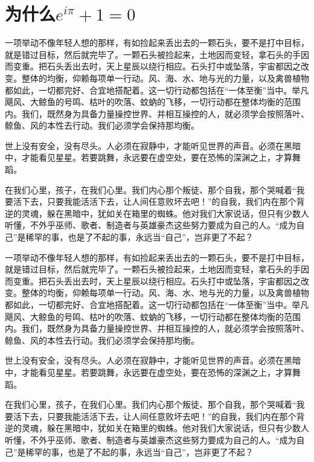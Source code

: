 \section{为什么$e^{i\pi} + 1 = 0$}
一项举动不像年轻人想的那样，有如捡起来丢出去的一颗石头，要不是打中目标，就是错过目标，然后就完毕了。一颗石头被捡起来，土地因而变轻，拿石头的手因而变重。把石头丢出去时，天上星辰以绕行相应。石头打中或坠落，宇宙都因之改变。整体的均衡，仰赖每项单一行动。风、海、水、地与光的力量，以及禽兽植物都如此，一切都完好、合宜地搭配着。这一切行动都包括在“一体至衡”当中。举凡飓风、大鲸鱼的号鸣、枯叶的吹落、蚊蚋的飞移，一切行动都在整体均衡的范围内。我们，既然身为具备力量操控世界、并相互操控的人，就必须学会按照落叶、鲸鱼、风的本性去行动。我们必须学会保持那均衡。


世上没有安全，没有尽头。人必须在寂静中，才能听见世界的声音。必须在黑暗中，才能看见星星。若要跳舞，永远要在虚空处，要在恐怖的深渊之上，才算舞蹈。


在我们心里，孩子，在我们心里。我们内心那个叛徒、那个自我，那个哭喊着“我要活下去，只要我能活活下去，让人间任意败坏去吧！”的自我，我们内在那个背逆的灵魂，躲在黑暗中，犹如关在箱里的蜘蛛。他对我们大家说话，但只有少数人听懂，不外乎巫师、歌者、制造者与英雄豪杰这些努力要成为自己的人。“成为自己”是稀罕的事，也是了不起的事，永远当“自己”，岂非更了不起？\cite{LeGuin}

{\kaishu 一项举动不像年轻人想的那样，有如捡起来丢出去的一颗石头，要不是打中目标，就是错过目标，然后就完毕了。一颗石头被捡起来，土地因而变轻，拿石头的手因而变重。把石头丢出去时，天上星辰以绕行相应。石头打中或坠落，宇宙都因之改变。整体的均衡，仰赖每项单一行动。风、海、水、地与光的力量，以及禽兽植物都如此，一切都完好、合宜地搭配着。这一切行动都包括在“一体至衡”当中。举凡飓风、大鲸鱼的号鸣、枯叶的吹落、蚊蚋的飞移，一切行动都在整体均衡的范围内。我们，既然身为具备力量操控世界、并相互操控的人，就必须学会按照落叶、鲸鱼、风的本性去行动。我们必须学会保持那均衡。


世上没有安全，没有尽头。人必须在寂静中，才能听见世界的声音。必须在黑暗中，才能看见星星。若要跳舞，永远要在虚空处，要在恐怖的深渊之上，才算舞蹈。


在我们心里，孩子，在我们心里。我们内心那个叛徒、那个自我，那个哭喊着“我要活下去，只要我能活活下去，让人间任意败坏去吧！”的自我，我们内在那个背逆的灵魂，躲在黑暗中，犹如关在箱里的蜘蛛。他对我们大家说话，但只有少数人听懂，不外乎巫师、歌者、制造者与英雄豪杰这些努力要成为自己的人。“成为自己”是稀罕的事，也是了不起的事，永远当“自己”，岂非更了不起？}

